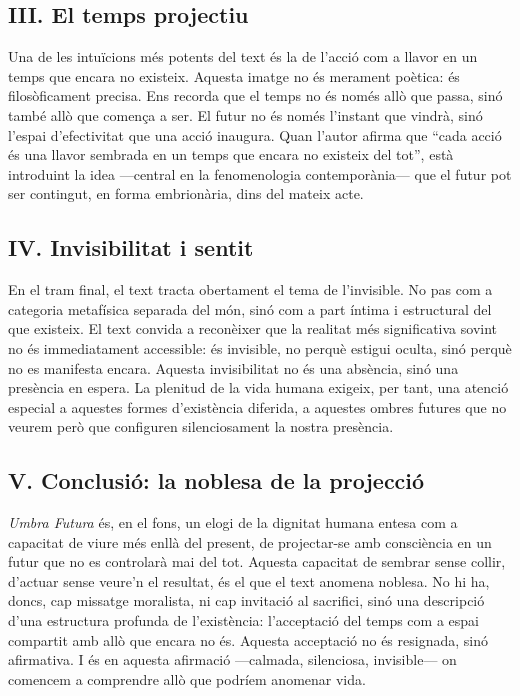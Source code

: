 \subsection*{III. El temps projectiu}

\noindent
Una de les intuïcions més potents del text és la de l’acció com a llavor en un temps que encara no existeix. Aquesta imatge no és merament poètica: és filosòficament precisa. Ens recorda que el temps no és només allò que passa, sinó també allò que comença a ser. El futur no és només l’instant que vindrà, sinó l’espai d’efectivitat que una acció inaugura. Quan l’autor afirma que “cada acció és una llavor sembrada en un temps que encara no existeix del tot”, està introduint la idea —central en la fenomenologia contemporània— que el futur pot ser contingut, en forma embrionària, dins del mateix acte.

\subsection*{IV. Invisibilitat i sentit}

\noindent
En el tram final, el text tracta obertament el tema de l’invisible. No pas com a categoria metafísica separada del món, sinó com a part íntima i estructural del que existeix. El text convida a reconèixer que la realitat més significativa sovint no és immediatament accessible: és invisible, no perquè estigui oculta, sinó perquè no es manifesta encara. Aquesta invisibilitat no és una absència, sinó una presència en espera. La plenitud de la vida humana exigeix, per tant, una atenció especial a aquestes formes d’existència diferida, a aquestes ombres futures que no veurem però que configuren silenciosament la nostra presència.

\subsection*{V. Conclusió: la noblesa de la projecció}

\noindent
\textit{Umbra Futura} és, en el fons, un elogi de la dignitat humana entesa com a capacitat de viure més enllà del present, de projectar-se amb consciència en un futur que no es controlarà mai del tot. Aquesta capacitat de sembrar sense collir, d’actuar sense veure’n el resultat, és el que el text anomena noblesa. No hi ha, doncs, cap missatge moralista, ni cap invitació al sacrifici, sinó una descripció d’una estructura profunda de l’existència: l’acceptació del temps com a espai compartit amb allò que encara no és. Aquesta acceptació no és resignada, sinó afirmativa. I és en aquesta afirmació —calmada, silenciosa, invisible— on comencem a comprendre allò que podríem anomenar vida.